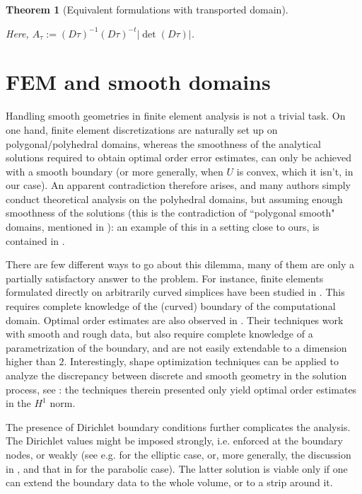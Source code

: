 \documentclass[english,a4paper,9pt,oneside]{scrbook}	%
\theoremstyle{break}
\newtheorem{thm}[equation]{Theorem}
\theoremstyle{remark}
\begin{document}
\begin{appendices}
\begin{thm}[Equivalent formulations with transported domain]
\begin{itemize}
\end{itemize}

Here, $A_\tau:=  (D\tau)^{-1}(D\tau)^{-t}|\det(D\tau)|$.

\end{thm}

\chapter{FEM and smooth domains}
\label{chap:inh_fem}
Handling smooth geometries in finite element analysis is not a trivial task. On one hand, finite element discretizations are naturally set up on polygonal/polyhedral domains, whereas the smoothness of the analytical solutions required to obtain optimal order error estimates, can only be achieved with a smooth boundary (or more generally, when $U$ is convex, which it isn't, in our case). An apparent contradiction therefore arises, and many authors simply conduct theoretical analysis on the polyhedral domains, but assuming enough smoothness of the solutions (this is the contradiction of ``polygonal smooth" domains, mentioned in \cite{tiihonen}): an example of this in a setting close to ours, is contained in \cite{paganini}. 

There are few different ways to go about this dilemma, many of them are only a partially satisfactory answer to the problem. For instance, finite elements formulated directly on arbitrarily curved simplices have been studied in \cite{zlamal}. This requires complete knowledge of the (curved) boundary of the computational domain. Optimal order estimates are also observed in \cite{bramble}. Their techniques work with smooth and rough data, but also require complete knowledge of a parametrization of the boundary, and are not easily extendable to a dimension higher than $2$. Interestingly, shape optimization techniques can be applied to analyze the discrepancy between discrete and smooth geometry in the solution process, see \cite{tiihonen}: the techniques therein presented only yield optimal order estimates in the $H^1$ norm.

The presence of Dirichlet boundary conditions further complicates the analysis. The Dirichlet values might be imposed strongly, i.e. enforced at the boundary nodes, or weakly (see e.g. \cite{chiba} for the elliptic case, or, more generally, the discussion in \cite{chouly}, and that in \cite{benner} for the parabolic case). The latter solution is viable only if one can extend the boundary data to the whole volume, or to a strip around it.


\end{appendices}
\end{document}
